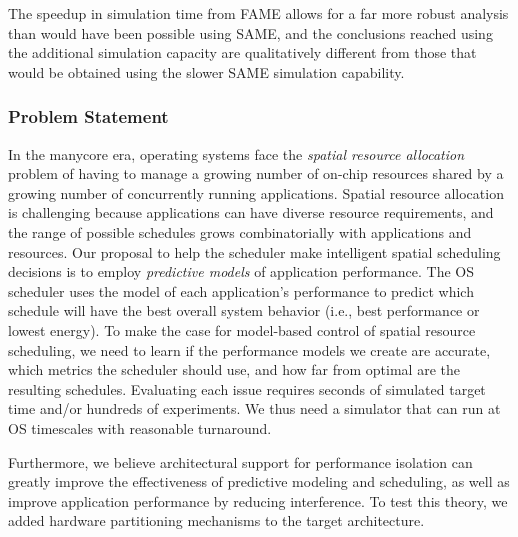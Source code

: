The speedup in simulation time from FAME allows for a far more robust
analysis than would have been possible using SAME, and the conclusions
reached using the additional simulation capacity are qualitatively
different from those that would be obtained using the slower SAME
simulation capability.


\subsubsection*{Problem Statement}

In the manycore era, operating systems face the \emph{spatial resource
  allocation} problem of having to manage a growing number of on-chip
resources shared by a growing number of concurrently running
applications.
Spatial resource allocation is challenging because applications can
have diverse resource requirements, and the range of possible
schedules grows combinatorially with applications and resources.
Our proposal to help the scheduler make intelligent spatial
scheduling decisions is to employ {\em predictive models} of
application performance.  The OS scheduler uses the model of each
application's performance to predict which schedule will have the best
overall system behavior (i.e., best performance or lowest energy).
To make the case for model-based control of spatial resource
scheduling, we need to learn if the performance models we create are
accurate, which metrics the scheduler should use, and how far from
optimal are the resulting schedules. Evaluating each issue requires
seconds of simulated target time and/or hundreds of experiments. We
thus need a simulator that can run at OS timescales with reasonable
turnaround.

Furthermore, we believe architectural support for performance
isolation can greatly improve the effectiveness of predictive modeling
and scheduling, as well as improve application performance by reducing
interference. To test this theory, we added hardware partitioning
mechanisms to the target architecture.


